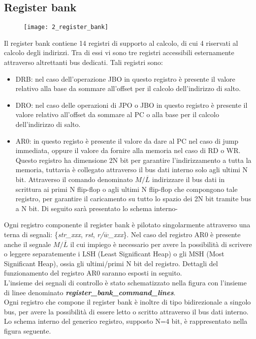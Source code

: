\subsection{Register bank}
\begin{figure}[H]
	\centering
	\texttt{[image: 2\_register\_bank]}
	\label{fig:register_bank}
\end{figure}
Il register bank contiene 14 registri di supporto al calcolo, di cui 4 riservati al calcolo degli indirizzi. Tra di essi vi sono tre registri accessibili esternamente attraverso altrettanti bus dedicati. Tali registri sono:
\begin{itemize}
	\item DRB: nel caso dell'operazione JBO in questo registro è presente il valore relativo alla base da sommare all'offset per il calcolo dell'indirizzo di salto.
	\item DRO: nel caso delle operazioni di JPO o JBO in questo registro è presente il valore relativo all'offset da sommare al PC o alla base per il calcolo dell'indirizzo di salto.
	\item AR0: in questo registo è presente il valore da dare al PC nel caso di jump immediata, oppure il valore da fornire alla memoria nel caso di RD o WR. Questo registro ha dimensione 2N bit per garantire l'indirizzamento a tutta la memoria, tuttavia è collegato attraverso il bus dati interno solo agli ultimi N bit. Attraverso il comando denominato $M/\overline{L}$ indirizzare il bus dati in scrittura ai primi N flip-flop o agli ultimi N flip-flop che compongono tale registro, per garantire il caricamento su tutto lo spazio dei 2N bit tramite bus a N bit. Di seguito sarà presentato lo schema interno-
\end{itemize}
Ogni registro componente il register bank è pilotato singolarmente attraverso una terna di segnali: \{\textit{str\_xxx}, \textit{rst}, \textit{r/$\overline{w}$\_xxx}\}. Nel caso del registro AR0 è presente anche il segnale $M/\overline{L}$ il cui impiego è necessario per avere la possibilità di scrivere o leggere separatemente i LSH (Least Significant Heap) o gli MSH (Most Significant Heap), ossia gli ultimi/primi N bit del registro. Dettagli del funzionamento del registro AR0 saranno esposti in seguito.\\
L'insieme dei segnali di controllo è stato schematizzato nella figura con l'insieme di linee denominato \textit{\textbf{register\_bank\_command\_lines}}.\\
Ogni registro che compone il register bank è inoltre di tipo bidirezionale a singolo bus, per avere la possibilità di essere letto o scritto attraverso il bus dati interno. Lo schema interno del generico registro, supposto N=4 bit, è rappresentato nella figura seguente.
